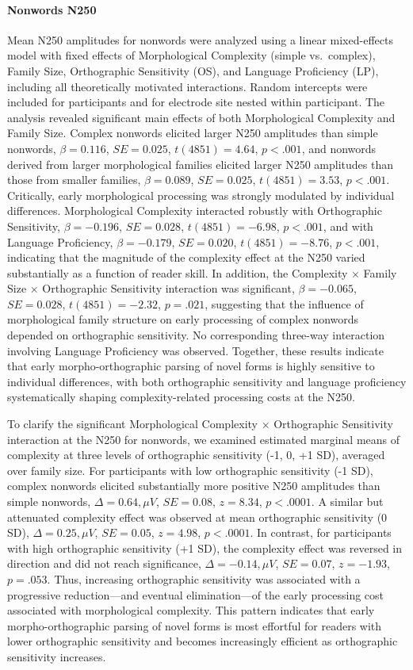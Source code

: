\paragraph*{Nonwords N250}
Mean N250 amplitudes for nonwords were analyzed using a linear mixed-effects model with fixed effects of Morphological Complexity (simple vs.\ complex), Family Size, Orthographic Sensitivity (OS), and Language Proficiency (LP), including all theoretically motivated interactions. Random intercepts were included for participants and for electrode site nested within participant. The analysis revealed significant main effects of both Morphological Complexity and Family Size. Complex nonwords elicited larger N250 amplitudes than simple nonwords, $\beta = 0.116$, $SE = 0.025$, $t(4851) = 4.64$, $p < .001$, and nonwords derived from larger morphological families elicited larger N250 amplitudes than those from smaller families, $\beta = 0.089$, $SE = 0.025$, $t(4851) = 3.53$, $p < .001$. Critically, early morphological processing was strongly modulated by individual differences. Morphological Complexity interacted robustly with Orthographic Sensitivity, $\beta = -0.196$, $SE = 0.028$, $t(4851) = -6.98$, $p < .001$, and with Language Proficiency, $\beta = -0.179$, $SE = 0.020$, $t(4851) = -8.76$, $p < .001$, indicating that the magnitude of the complexity effect at the N250 varied substantially as a function of reader skill. In addition, the Complexity × Family Size × Orthographic Sensitivity interaction was significant, $\beta = -0.065$, $SE = 0.028$, $t(4851) = -2.32$, $p = .021$, suggesting that the influence of morphological family structure on early processing of complex nonwords depended on orthographic sensitivity. No corresponding three-way interaction involving Language Proficiency was observed. Together, these results indicate that early morpho-orthographic parsing of novel forms is highly sensitive to individual differences, with both orthographic sensitivity and language proficiency systematically shaping complexity-related processing costs at the N250.

To clarify the significant Morphological Complexity × Orthographic Sensitivity interaction at the N250 for nonwords, we examined estimated marginal means of complexity at three levels of orthographic sensitivity (-1, 0, +1 SD), averaged over family size. For participants with low orthographic sensitivity (-1 SD), complex nonwords elicited substantially more positive N250 amplitudes than simple nonwords, $\Delta = 0.64,\mu V$, $SE = 0.08$, $z = 8.34$, $p < .0001$. A similar but attenuated complexity effect was observed at mean orthographic sensitivity (0 SD), $\Delta = 0.25,\mu V$, $SE = 0.05$, $z = 4.98$, $p < .0001$. In contrast, for participants with high orthographic sensitivity (+1 SD), the complexity effect was reversed in direction and did not reach significance, $\Delta = -0.14,\mu V$, $SE = 0.07$, $z = -1.93$, $p = .053$. Thus, increasing orthographic sensitivity was associated with a progressive reduction—and eventual elimination—of the early processing cost associated with morphological complexity. This pattern indicates that early morpho-orthographic parsing of novel forms is most effortful for readers with lower orthographic sensitivity and becomes increasingly efficient as orthographic sensitivity increases.

